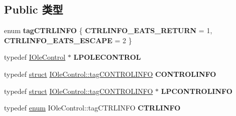 \subsection*{Public 类型}
\begin{DoxyCompactItemize}
\item 
\mbox{\label{interface_i_ole_control_a5f75e66b407caa93150c1e7e914cc084}} 
enum {\bfseries tag\+C\+T\+R\+L\+I\+N\+FO} \{ {\bfseries C\+T\+R\+L\+I\+N\+F\+O\+\_\+\+E\+A\+T\+S\+\_\+\+R\+E\+T\+U\+RN} = 1, 
{\bfseries C\+T\+R\+L\+I\+N\+F\+O\+\_\+\+E\+A\+T\+S\+\_\+\+E\+S\+C\+A\+PE} = 2
 \}
\item 
\mbox{\label{interface_i_ole_control_ad8812989acd6b5eb83ad2b7748a3280d}} 
typedef \hyperlink{interface_i_ole_control}{I\+Ole\+Control} $\ast$ {\bfseries L\+P\+O\+L\+E\+C\+O\+N\+T\+R\+OL}
\item 
\mbox{\label{interface_i_ole_control_a40b10cee2d8095df78e782e60021f7a1}} 
typedef \hyperlink{interfacestruct}{struct} \hyperlink{struct_i_ole_control_1_1tag_c_o_n_t_r_o_l_i_n_f_o}{I\+Ole\+Control\+::tag\+C\+O\+N\+T\+R\+O\+L\+I\+N\+FO} {\bfseries C\+O\+N\+T\+R\+O\+L\+I\+N\+FO}
\item 
\mbox{\label{interface_i_ole_control_ac29483c2366c3a6b5e544bf3475f5b47}} 
typedef \hyperlink{interfacestruct}{struct} \hyperlink{struct_i_ole_control_1_1tag_c_o_n_t_r_o_l_i_n_f_o}{I\+Ole\+Control\+::tag\+C\+O\+N\+T\+R\+O\+L\+I\+N\+FO} $\ast$ {\bfseries L\+P\+C\+O\+N\+T\+R\+O\+L\+I\+N\+FO}
\item 
\mbox{\label{interface_i_ole_control_a429101b7828f8bf452cfc31a88c3d04d}} 
typedef \hyperlink{interfaceenum}{enum} I\+Ole\+Control\+::tag\+C\+T\+R\+L\+I\+N\+FO {\bfseries C\+T\+R\+L\+I\+N\+FO}
\end{DoxyCompactItemize}
